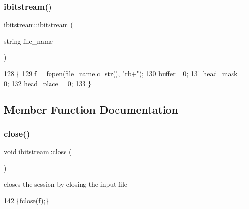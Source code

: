 \subsubsection{\texorpdfstring{ibitstream()}{ibitstream()}}
{\footnotesize\ttfamily ibitstream\+::ibitstream (\begin{DoxyParamCaption}\item[{string}]{file\+\_\+name }\end{DoxyParamCaption})\hspace{0.3cm}{\ttfamily [inline]}}


\begin{DoxyCode}
128                               \{
129     \hyperlink{classibitstream_a3ea2cdd0cf97820f0e1520c42e364308}{f} = fopen(file\_name.c\_str(), \textcolor{stringliteral}{"rb+"});
130     \hyperlink{classibitstream_a73f0b24d3d4402369f1abbb43f7f70ef}{buffer} =0;
131     \hyperlink{classibitstream_a48cd41991b6c29ea5120b53873a72a70}{head\_mask} = 0;
132     \hyperlink{classibitstream_a7b96359ac1534a5565e6e9b0cc53a0b3}{head\_place} = 0;
133   \}
\end{DoxyCode}


\subsection{Member Function Documentation}
\mbox{\label{classibitstream_aa7b59600e58571b802d6d0dadf92d37a}} 
\subsubsection{\texorpdfstring{close()}{close()}}
{\footnotesize\ttfamily void ibitstream\+::close (\begin{DoxyParamCaption}{ }\end{DoxyParamCaption})\hspace{0.3cm}{\ttfamily [inline]}}



closes the session by closing the input file 


\begin{DoxyCode}
142 \{fclose(\hyperlink{classibitstream_a3ea2cdd0cf97820f0e1520c42e364308}{f});\}
\end{DoxyCode}
\mbox{\label{classibitstream_ae3e91ecc9ff17eef98d72d44aec02eca}} 
